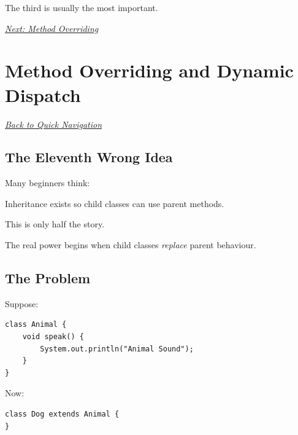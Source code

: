 \documentclass[11pt,a4paper]{book}
\begin{document}

The third is usually the most important.

\smallskip
\noindent
\hyperref[sec:method_overriding]{\emph{Next: Method Overriding}}

\chapter{Method Overriding and Dynamic Dispatch}\label{chap:method_overriding}

\smallskip
\noindent
\hyperref[sec:quick_nav]{\emph{Back to Quick Navigation}}


\section{The Eleventh Wrong Idea}

\begin{trap}

Many beginners think:

Inheritance exists so child classes can
use parent methods.

This is only half the story.

The real power begins when child classes
\emph{replace} parent behaviour.

\end{trap}


\section{The Problem}

Suppose:

\begin{verbatim}
class Animal {
    void speak() {
        System.out.println("Animal Sound");
    }
}
\end{verbatim}


Now:

\begin{verbatim}
class Dog extends Animal {
}
\end{verbatim}
\end{document}
